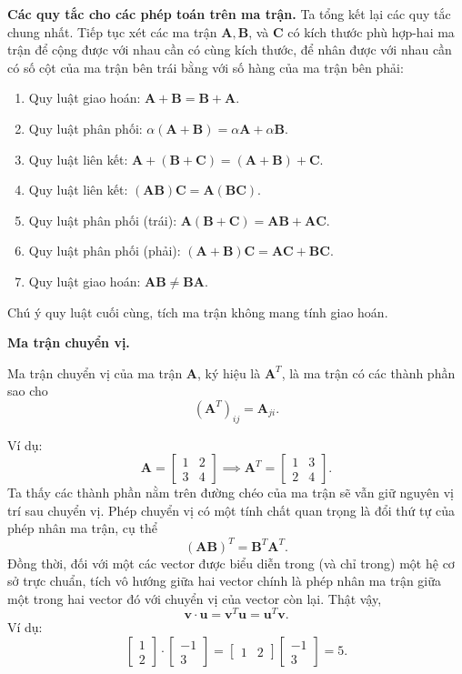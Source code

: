 \textbf{Các quy tắc cho các phép toán trên ma trận.} Ta tổng kết lại các quy tắc chung nhất.
Tiếp tục xét các ma trận \(\mathbf{A},\mathbf{B}\), và \(\mathbf{C}\) có kích thước phù hợp-hai ma trận để cộng được với nhau cần có cùng kích thước, để nhân được với nhau cần có số cột của ma trận bên trái bằng với số hàng của ma trận bên phải:
\begin{enumerate}[label=(\alph*)]
    \item Quy luật giao hoán: \(\mathbf{A}+\mathbf{B}=\mathbf{B}+\mathbf{A}.\)
    \item Quy luật phân phối: \(\alpha(\mathbf{A}+\mathbf{B})=\alpha\mathbf{A}+\alpha\mathbf{B}.\)
    \item Quy luật liên kết: \(\mathbf{A}+(\mathbf{B}+\mathbf{C})=(\mathbf{A}+\mathbf{B})+\mathbf{C}.\)
    \item Quy luật liên kết: \((\mathbf{AB})\mathbf{C}=\mathbf{A}(\mathbf{BC}).\)
    \item Quy luật phân phối (trái): \(\mathbf{A}(\mathbf{B}+\mathbf{C})=\mathbf{AB}+\mathbf{AC}.\)
    \item Quy luật phân phối (phải): \((\mathbf{A}+\mathbf{B})\mathbf{C}=\mathbf{AC}+\mathbf{BC}.\)
    \item Quy luật giao hoán: \(\mathbf{AB} \neq \mathbf{BA}\).
\end{enumerate}
Chú ý quy luật cuối cùng, tích ma trận không mang tính giao hoán.
\vspace{8pt}

\textbf{Ma trận chuyển vị.}
\begin{definition}
    Ma trận chuyển vị của ma trận \(\mathbf{A}\), ký hiệu là \(\mathbf{A}^T\), là ma trận có các thành phần sao cho \[(\mathbf{A}^T)_{ij}=\mathbf{A}_{ji}.\]
\end{definition}
Ví dụ: \[\mathbf{A}=\begin{bmatrix}
    1&2\\3&4
\end{bmatrix}\implies \mathbf{A}^T =\begin{bmatrix}
    1&3\\2&4
\end{bmatrix}.\] Ta thấy các thành phần nằm trên đường chéo của ma trận sẽ vẫn giữ nguyên vị trí sau chuyển vị.
Phép chuyển vị có một tính chất quan trọng là đổi thứ tự của phép nhân ma trận, cụ thể 
\[(\mathbf{AB})^T =\mathbf{B}^T \mathbf{A}^T .\] Đồng thời, đối với một các vector được biểu diễn trong (và chỉ trong) một hệ cơ sở trực chuẩn, tích vô hướng giữa hai vector chính là phép nhân ma trận 
giữa một trong hai vector đó với chuyển vị của vector còn lại. Thật vậy, 
\[\mathbf{v}\cdot \mathbf{u}=\mathbf{v}^T \mathbf{u}=\mathbf{u}^T \mathbf{v}.\] 
Ví dụ: \[\begin{bmatrix}
    1\\2
\end{bmatrix}\cdot\begin{bmatrix}
    -1\\3
\end{bmatrix}=\begin{bmatrix}
    1&2
\end{bmatrix}\begin{bmatrix}
    -1\\3
\end{bmatrix}=5.\]
